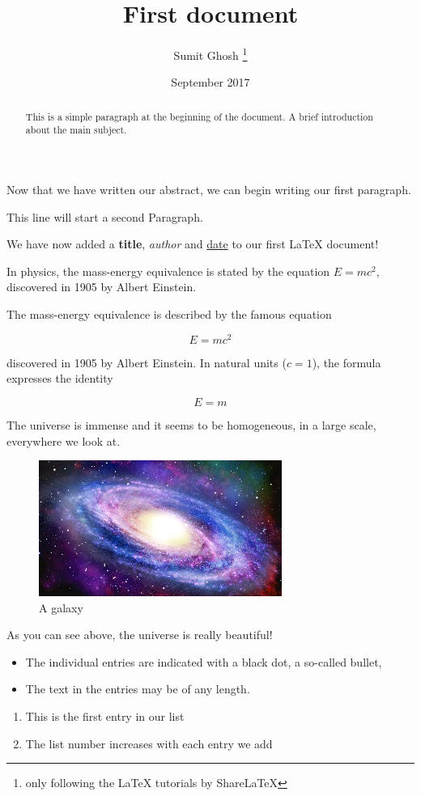 \documentclass[12pt, letterpaper]{article}
\title{First document}
\author{Sumit Ghosh \thanks{only following the LaTeX tutorials by ShareLaTeX}}
\date{September 2017}
\begin{document}
\maketitle

\begin{abstract}
This is a simple paragraph at the beginning of the 
document. A brief introduction about the main subject.
\end{abstract}
 
Now that we have written our abstract, we can begin writing our first paragraph.
 
This line will start a second Paragraph.

We have now added a \textbf{title}, \textit{author} and \underline{date} to our first \LaTeX{} document!

In physics, the mass-energy equivalence is stated by the equation $E=mc^2$, discovered in 1905 by Albert Einstein.

The mass-energy equivalence is described by the famous equation

$$E=mc^2$$

discovered in 1905 by Albert Einstein.
In natural units ($c=1$), the formula expresses the identity

\begin{equation}
E=m
\end{equation}

The universe is immense and it seems to be homogeneous, in a large scale, everywhere we look at.

\begin{figure}[h]
	\centering
	\includegraphics{galaxy}
	\caption{A galaxy}
	\label{fig:mesh1}
\end{figure}

As you can see above, the universe is really beautiful!

\begin{itemize}
		\item The individual entries are indicated with a black dot, a so-called bullet,
		\item The text in the entries may be of any length.
\end{itemize}

\begin{enumerate}
	\item This is the first entry in our list
	\item The list number increases with each entry we add
\end{enumerate}
\end{document}
